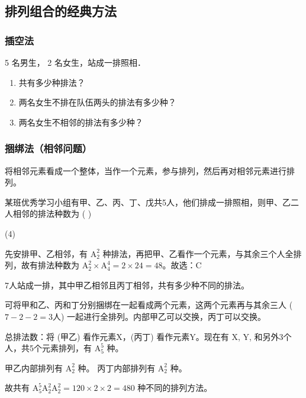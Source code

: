 
\subsection{排列组合的经典方法}

\subsubsection{插空法}

\begin{example}
    5 名男生， 2 名女生，站成一排照相．
    \begin{enumerate}[(1)]
        \item 共有多少种排法？ \underline{\hspace{3cm}}
        \item 两名女生不排在队伍两头的排法有多少种？ \underline{\hspace{3cm}}
        \item 两名女生不相邻的排法有多少种？ \underline{\hspace{3cm}}
    \end{enumerate}
\end{example}

\subsubsection{捆绑法（相邻问题）}
将相邻元素看成一个整体，当作一个元素，参与排列，然后再对相邻元素进行排列。

\begin{example}
    某班优秀学习小组有甲、乙、丙、丁、戊共5人，他们排成一排照相，则甲、乙二人相邻的排法种数为 ( )
    \begin{tasks}(4)
    \end{tasks}
\end{example}

\begin{solution}
    先安排甲、乙相邻，有 $\mathrm{A}_{2}^{2}$ 种排法，再把甲、乙看作一个元素，与其余三个人全排列，故有排法种数为 $\mathrm{A}_{2}^{2} \times \mathrm{A}_{4}^{4} = 2 \times 24 = 48$。故选：C
\end{solution}

\begin{example}
    7人站成一排，其中甲乙相邻且丙丁相邻，共有多少种不同的排法。
\end{example}

\begin{solution}
    可将甲和乙、丙和丁分别捆绑在一起看成两个元素，这两个元素再与其余三人 ($7-2-2=3$人) 一起进行全排列。内部甲乙可以交换，丙丁可以交换。

    总排法数：将 (甲乙) 看作元素X，(丙丁) 看作元素Y。现在有 X, Y, 和另外3个人，共5个元素排列，有 $\mathrm{A}_{5}^{5}$ 种。

    甲乙内部排列有 $\mathrm{A}_{2}^{2}$ 种。
    丙丁内部排列有 $\mathrm{A}_{2}^{2}$ 种。

    故共有 $\mathrm{A}_{5}^{5} \mathrm{A}_{2}^{2} \mathrm{A}_{2}^{2} = 120 \times 2 \times 2 = 480$ 种不同的排列方法。
\end{solution}

